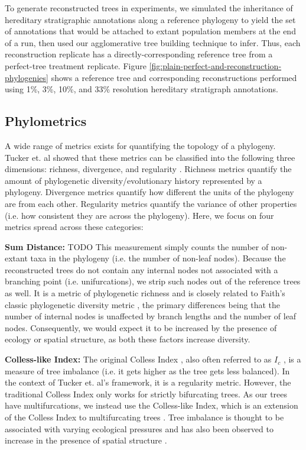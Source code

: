 To generate reconstructed trees in experiments, we simulated the inheritance of hereditary stratigraphic annotations along a reference phylogeny to yield the set of annotations that would be attached to extant population members at the end of a run, then used our agglomerative tree building technique to infer.
Thus, each reconstruction replicate has a directly-corresponding reference tree from a perfect-tree treatment replicate.
Figure \ref{fig:plain-perfect-and-reconstruction-phylogenies} shows a reference tree and corresponding reconstructions performed using 1\%, 3\%, 10\%, and 33\% resolution hereditary stratigraph annotations.

\subsection{Phylometrics}

A wide range of metrics exists for quantifying the topology of a phylogeny.
Tucker et.
al showed that these metrics can be classified into the following three dimensions: richness, divergence, and regularity \citep{tuckerGuidePhylogeneticMetrics2017}.
Richness metrics quantify the amount of phylogenetic diversity/evolutionary history represented by a phylogeny.
Divergence metrics quantify how different the units of the phylogeny are from each other.
Regularity metrics quantify the variance of other properties (i.e. how consistent they are across the phylogeny).
Here, we focus on four metrics spread across these categories:

\textbf{Sum Distance:} TODO
This measurement simply counts the number of non-extant taxa in the phylogeny (i.e. the number of non-leaf nodes).
Because the reconstructed trees do not contain any internal nodes not associated with a branching point (i.e. unifurcations), we strip such nodes out of the reference trees as well.
It is a metric of phylogenetic richness and is closely related to Faith's classic phylogenetic diversity metric \citep{faithConservationEvaluationPhylogenetic1992}, the primary differences being that the number of internal nodes is unaffected by branch lengths and the number of leaf nodes.
Consequently, we would expect it to be increased by the presence of ecology or spatial structure, as both these factors increase diversity.

\textbf{Colless-like Index:}
The original Colless Index \citep{collessReviewPhylogeneticsTheory1982}, also often referred to as $I_c$ \citep{shaoTreeBalance1990}, is a measure of tree imbalance (i.e. it gets higher as the tree gets less balanced).
In the context of Tucker et.
al's framework, it is a regularity metric.
However, the traditional Colless Index only works for strictly bifurcating trees.
As our trees have multifurcations, we instead use the Colless-like Index, which is an extension of the Colless Index to multifurcating trees \citep{mirSoundCollesslikeBalance2018}.
Tree imbalance is thought to be associated with varying ecological pressures \citep{chamberlainPhylogeneticTreeShape2014, burressEcologicalOpportunityAlters} and has also been observed to increase in the presence of spatial structure \citep{scottInferringTumorProliferative2020}.

